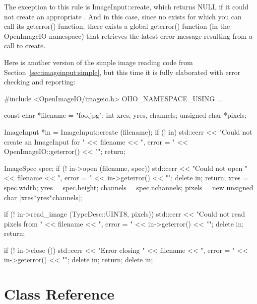 The exception to this rule is {\cf ImageInput::create}, which returns
{\cf NULL} if it could not create an appropriate \ImageInput.  And in
this case, since no \ImageInput exists for which you can call its {\cf
  geterror()} function, there exists a global {\cf geterror()}
function (in the {\cf OpenImageIO} namespace) that retrieves the latest
error message resulting from a call to {\cf create}.

Here is another version of the simple image reading code from
Section~\ref{sec:imageinput:simple}, but this time it is fully
elaborated with error checking and reporting:

\begin{code}
        #include <OpenImageIO/imageio.h>
        OIIO_NAMESPACE_USING
        ...

        const char *filename = "foo.jpg";
        int xres, yres, channels;
        unsigned char *pixels;

        ImageInput *in = ImageInput::create (filename);
        if (! in) {
            std::cerr << "Could not create an ImageInput for " 
                      << filename << ", error = " 
                      << OpenImageIO::geterror() << "\n";
            return;
        }

        ImageSpec spec;
        if (! in->open (filename, spec)) {
            std::cerr << "Could not open " << filename 
                      << ", error = " << in->geterror() << "\n";
            delete in;
            return;
        }
        xres = spec.width;
        yres = spec.height;
        channels = spec.nchannels;
        pixels = new unsigned char [xres*yres*channels];

        if (! in->read_image (TypeDesc::UINT8, pixels)) {
            std::cerr << "Could not read pixels from " << filename 
                      << ", error = " << in->geterror() << "\n";
            delete in;
            return;
        }

        if (! in->close ()) {
            std::cerr << "Error closing " << filename 
                      << ", error = " << in->geterror() << "\n";
            delete in;
            return;
        }
        delete in;
\end{code}


\newpage
\section{\ImageInput Class Reference}
\label{sec:imageinput:reference}

